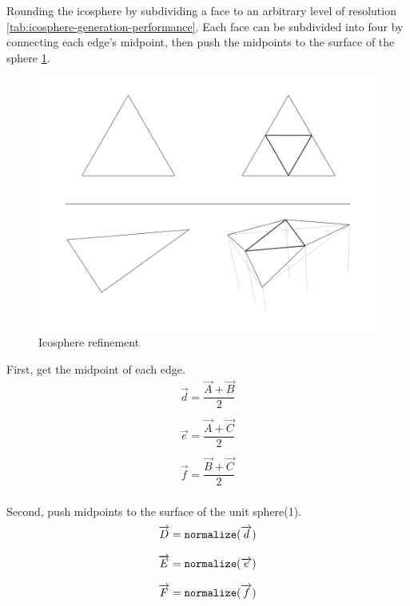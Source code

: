 Rounding the icosphere by subdividing a face to an arbitrary level of resolution \ref{tab:icosphere-generation-performance}. Each face can be subdivided into four by connecting each edge's midpoint, then push the midpoints to the surface of the sphere \ref{fig:icosphere-refinement}.

\begin{figure}[H]
\caption{Icosphere refinement}
\label{fig:icosphere-refinement}
\centering
\includegraphics[width=\textwidth, keepaspectratio]{Figures/icosphere-refinement.png}
\decoRule
\end{figure}

First, get the midpoint of each edge.
\[
\begin{array}{lr}
\overrightarrow{d} = \dfrac{\overrightarrow{A} + \overrightarrow{B}}{2}\\\\
\overrightarrow{e} = \dfrac{\overrightarrow{A} + \overrightarrow{C}}{2}\\\\
\overrightarrow{f} = \dfrac{\overrightarrow{B} + \overrightarrow{C}}{2}\\
\end{array}
\]

Second, push midpoints to the surface of the unit sphere(1).
\[
\begin{array}{lr}
\overrightarrow{D} = \texttt{normalize}(\overrightarrow{d})\\\\
\overrightarrow{E} = \texttt{normalize}(\overrightarrow{e})\\\\
\overrightarrow{F} = \texttt{normalize}(\overrightarrow{f})\\
\end{array}
\]


